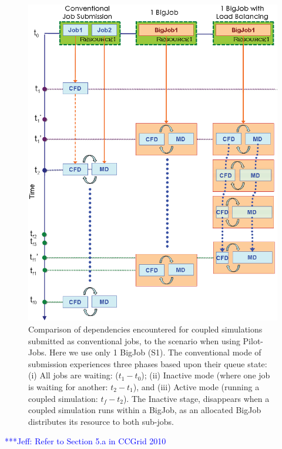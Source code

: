 \documentclass[conference,final]{IEEEtran}
\newcommand{\skonote}[1]{ {\textcolor{blue} { ***Jeff: #1 }}}
\newcommand{\skonote}[1]{}
\begin{document}
\begin{figure}
\centering
\includegraphics[scale=0.4]{Simulation_Time_of_One_BigJob.eps}
\caption{\small Comparison of dependencies encountered for coupled
  simulations submitted as conventional jobs, to the scenario when
  using Pilot-Jobs. Here we use only 1 BigJob (S1). The conventional
  mode of submission experiences three phases based upon their queue
  state: (i) All jobs are waiting: ($t_1-t_0$); (ii) Inactive mode
  (where one job is waiting for another: $t_2-t_1$), and (iii) Active
  mode (running a coupled simulation: $t_f-t_2$). The Inactive stage,
  disappears when a coupled simulation runs within a BigJob, as an
  allocated BigJob distributes its resource to both sub-jobs.}
\label{Fig:OneBJ_Flow}
\vspace{-1em}
\end{figure}


\skonote{Refer to Section 5.a in CCGrid 2010}
\newline
\newline
\end{document}
